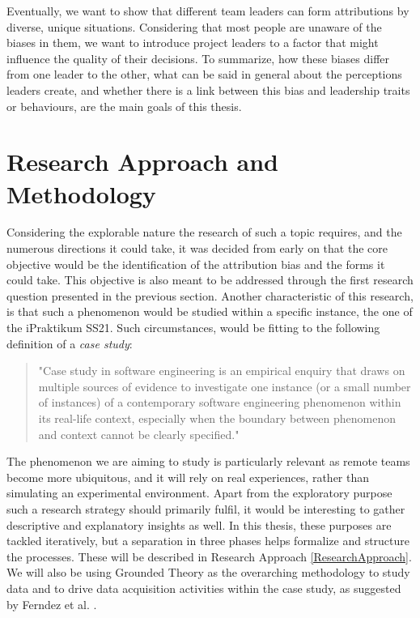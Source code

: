 Eventually, we want to show that different team leaders can form attributions by diverse, unique situations. Considering that most people are unaware of the biases in them, we want to introduce project leaders to a factor that might influence the quality of their decisions. To summarize, how these biases differ from one leader to the other, what can be said in general about the perceptions leaders create, and whether there is a link between this bias and leadership traits or behaviours, are the main goals of this thesis.

\section{Research Approach and Methodology} \label{ResearchApproachAndMethodology}

Considering the explorable nature the research of such a topic requires, and the numerous directions it could take, it was decided from early on that the core objective would be the identification of the attribution bias and the forms it could take. This objective is also meant to be addressed through the first research question presented in the previous section. Another characteristic of this research, is that such a phenomenon would be studied within a specific instance, the one of the iPraktikum SS21. Such circumstances, would be fitting to the following definition of a \textit{case study}: 

\begin{quote}
"Case study in software engineering is an empirical enquiry that draws on multiple sources of evidence to investigate one instance (or a small number of instances) of a contemporary software engineering phenomenon within its real-life context, especially when the boundary between phenomenon and context cannot be clearly specified." \cite{Runeson2009}
\end{quote}

The phenomenon we are aiming to study is particularly relevant as remote teams become more ubiquitous, and it will rely on real experiences, rather than simulating an experimental environment. Apart from the exploratory purpose such a research strategy should primarily fulfil, it would be interesting to gather descriptive and explanatory insights as well. In this thesis, these purposes are tackled iteratively, but a separation in three phases helps formalize and structure the processes. These will be described in Research Approach \ref{ResearchApproach}. We will also be using Grounded Theory as the overarching methodology to study data and to drive data acquisition activities within the case study, as suggested by Ferndez et al. \cite{Fernandez2004}. 

